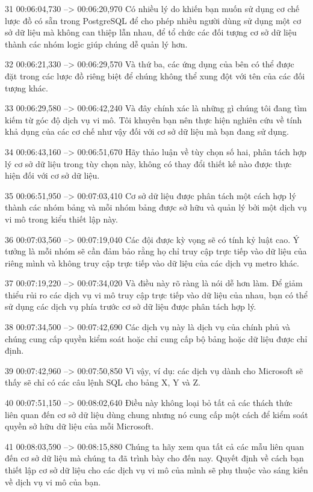 31
00:06:04,730 --> 00:06:20,970
Có nhiều lý do khiến bạn muốn sử dụng cơ chế lược đồ có sẵn trong PostgreSQL để cho phép nhiều người dùng sử dụng một cơ sở dữ liệu mà không can thiệp lẫn nhau, để tổ chức các đối tượng cơ sở dữ liệu thành các nhóm logic giúp chúng dễ quản lý hơn.

32
00:06:21,330 --> 00:06:29,570
Và thứ ba, các ứng dụng của bên có thể được đặt trong các lược đồ riêng biệt để chúng không thể xung đột với tên của các đối tượng khác.

33
00:06:29,580 --> 00:06:42,240
Và đây chính xác là những gì chúng tôi đang tìm kiếm từ góc độ dịch vụ vi mô.  Tôi khuyên bạn nên thực hiện nghiên cứu về tính khả dụng của các cơ chế như vậy đối với cơ sở dữ liệu mà bạn đang sử dụng.

34
00:06:43,160 --> 00:06:51,670
Hãy thảo luận về tùy chọn số hai, phân tách hợp lý cơ sở dữ liệu trong tùy chọn này, không có thay đổi thiết kế nào được thực hiện đối với cơ sở dữ liệu.

35
00:06:51,950 --> 00:07:03,410
Cơ sở dữ liệu được phân tách một cách hợp lý thành các nhóm bảng và mỗi nhóm bảng được sở hữu và quản lý bởi một dịch vụ vi mô trong kiểu thiết lập này.

36
00:07:03,560 --> 00:07:19,040
Các đội được kỳ vọng sẽ có tính kỷ luật cao.  Ý tưởng là mỗi nhóm sẽ cần đảm bảo rằng họ chỉ truy cập trực tiếp vào dữ liệu của riêng mình và không truy cập trực tiếp vào dữ liệu của các dịch vụ metro khác.

37
00:07:19,220 --> 00:07:34,020
Và điều này rõ ràng là nói dễ hơn làm.  Để giảm thiểu rủi ro các dịch vụ vi mô truy cập trực tiếp vào dữ liệu của nhau, bạn có thể sử dụng các dịch vụ phía trước cơ sở dữ liệu được phân tách hợp lý.

38
00:07:34,500 --> 00:07:42,690
Các dịch vụ này là dịch vụ của chính phủ và chúng cung cấp quyền kiểm soát hoặc chỉ cung cấp bộ bảng hoặc dữ liệu được chỉ định.

39
00:07:42,960 --> 00:07:50,850
Vì vậy, ví dụ: các dịch vụ dành cho Microsoft sẽ thấy sẽ chỉ có các câu lệnh SQL cho bảng X, Y và Z.

40
00:07:51,150 --> 00:08:02,640
Điều này không loại bỏ tất cả các thách thức liên quan đến cơ sở dữ liệu dùng chung nhưng nó cung cấp một cách để kiểm soát quyền sở hữu dữ liệu của mỗi Microsoft.

41
00:08:03,590 --> 00:08:15,880
Chúng ta hãy xem qua tất cả các mẫu liên quan đến cơ sở dữ liệu mà chúng ta đã trình bày cho đến nay.  Quyết định về cách bạn thiết lập cơ sở dữ liệu cho các dịch vụ vi mô của mình sẽ phụ thuộc vào sáng kiến ​​về dịch vụ vi mô của bạn.

